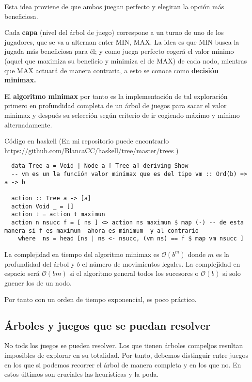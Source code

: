 \documentclass[12 pt, a4paper]{article}
\begin{document}
Esta idea proviene de que ambos juegan perfecto y elegiran la opción más beneficiosa. 




Cada \textbf{capa} (nivel del árbol de juego) correspone a un turno de uno de los jugadores, que se va a alternan enter MIN, MAX.
La idea es que MIN busca la jugada más beneficiosa para él; y como juega perfecto cogerá el valor mínimo (aquel que maximiza su beneficio y minimiza el de MAX) 
de cada nodo, mientras que MAX actuará de manera contraria, a esto se conoce como \textbf{decisión minimax.}

El \textbf{algoritmo minimax} por tanto es la implementación de tal exploración primero en profundidad completa de un árbol de juegos
para sacar el valor minimax y después su selección según criterio de ir cogiendo máximo y mínimo alternadamente. 

Código en haskell 
(En mi repositorio puede encontrarlo
https://github.com/BlancaCC/haskell/tree/master/trees )
\begin{verbatim}
  data Tree a = Void | Node a [ Tree a] deriving Show
  -- vm es un la función valor minimax que es del tipo vm :: Ord(b) => a -> b

  action :: Tree a -> [a]
  action Void _ = []
  action t = action t maximun
  action n nsucc f = [ ns ] <> action ns maximun $ map (-) -- de esta manera si f es maximun  ahora es minimum  y al contrario 
    where  ns = head [ns | ns <- nsucc, (vm ns) == f $ map vm nsucc ]
\end{verbatim}


La complejidad en tiempo del algoritmo minimax es  $\mathcal O (b^m)$ donde $m$ es la profundidad del árbol y 
$b$ el número de movimientos legales. La complejidad en espacio será $\mathcal{O}(bm)$ si el algoritmo general
todos los sucesores o $\mathcal{O}(b)$ si solo gnener los de un nodo. 

Por tanto con un orden de tiempo exponencial, es poco práctico. 

\subsection*{Árboles y juegos que se puedan resolver}  
No tods los juegos se pueden resolver. Los que tienen árboles compeljos resultan imposibles de explorar en su totalidad. Por tanto, debemos 
distinguir entre juegos en los que si podemos recorrer el árbol de manera completa y en los que no. En estos últimos son cruciales las heurísticas y la poda. 
\end{document}
